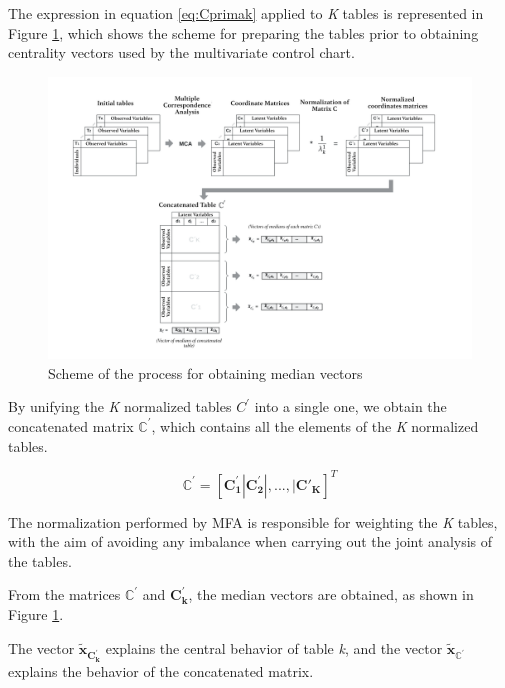 \documentclass[mathematics,article,submit,moreauthors,pdftex]{mdpi}
\begin{document}
The expression in equation \ref{eq:Cprimak} applied to \emph{K} tables
is represented in Figure \ref{fig:esquema1}, which shows the scheme for
preparing the tables prior to obtaining centrality vectors used by the
multivariate control chart.

\begin{figure}[!ht]


\begin{center}\includegraphics[width=0.9\linewidth,]{esquema_1i} \end{center}

\caption{Scheme of the process for obtaining median vectors}

\label{fig:esquema1}
\end{figure}

By unifying the \emph{K} normalized tables \(C^{'}\) into a single one,
we obtain the concatenated matrix \(\mathbb{C}^{'}\), which contains all
the elements of the \emph{K} normalized tables.

\begin{equation}
\mathbf{\mathbb{C^{'}}}=[\mathbf{C_1^{'}}|\mathbf{C_2^{'}}|,...,|\mathbf{C'_{K}}]^{T}
\label{eq:Cprima}
\end{equation}

The normalization performed by MFA is responsible for weighting the
\emph{K} tables, with the aim of avoiding any imbalance when carrying
out the joint analysis of the tables.

From the matrices \(\mathbf{\mathbb{C^{'}}}\) and \(\mathbf{C_k^{'}}\),
the median vectors are obtained, as shown in Figure \ref{fig:esquema1}.

The vector \(\mathbf{\tilde{x}_{C_k^{'}}}\) explains the central
behavior of table \emph{k}, and the vector
\(\mathbf{\tilde{x}_{\mathbb{C^{'}}}}\) explains the behavior of the
concatenated matrix.
\end{document}
